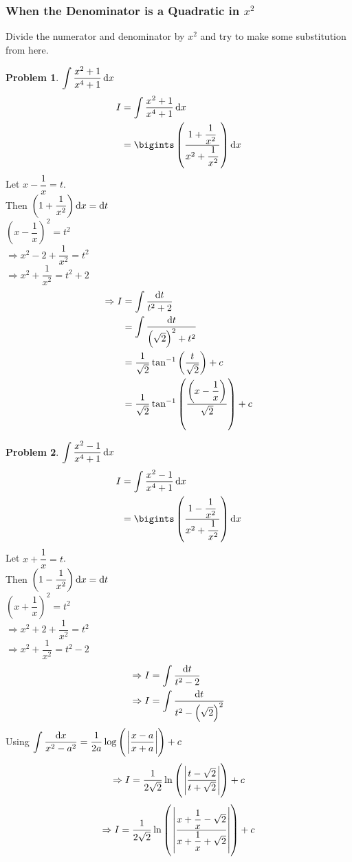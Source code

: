 \documentclass[14]{article}
\theoremstyle{definition}
\newtheorem{prob}{Problem}
\theoremstyle{case}
\begin{document}
\subsubsection{When the Denominator is a Quadratic in $x^2$}
Divide the numerator and denominator by $x^2$ and try to make some substitution from here.
\begin{prob}
$\displaystyle \int \dfrac{x^2 + 1}{x^4 + 1} \dif x$
\begin{align*}
I &= \int \dfrac{x^2 + 1}{x^4 + 1} \dif x\\
&= \bigints \left(\dfrac{1 + \dfrac1{x^2}}{x^2 + \dfrac1{x^2}}\right) \dif x
\end{align*}
Let $x - \dfrac1{x} = t$.\\
Then $\left(1 + \dfrac1{x^2}\right) \dif x = \dif t$\\
$\left( x - \dfrac1{x} \right)^2 = t^2$\\
$\Rightarrow x^2 - 2 + \dfrac1{x^2} = t^2$\\
$\Rightarrow x^2 + \dfrac1{x^2} = t^2 + 2$
\begin{align*}
\Rightarrow I &= \int \dfrac{\dif t}{t^2 + 2}\\
&= \int \dfrac{\dif t}{\left( \sqrt2 \right)^2 + t^2}\\
&= \dfrac1{\sqrt2} \tan^{-1} \left(\dfrac{t}{\sqrt 2} \right) + c\\
&= \dfrac1{\sqrt2} \tan^{-1} \left(\dfrac{\left(x - \dfrac1{x}\right)}{\sqrt 2} \right) + c
\end{align*}
\end{prob}
\pagebreak
\begin{prob}
$\displaystyle \int \dfrac{x^2 - 1}{x^4 + 1} \dif x$
\begin{align*}
I &= \int \dfrac{x^2 - 1}{x^4 + 1} \dif x\\
&= \bigints \left(\dfrac{1 - \dfrac1{x^2}}{x^2 + \dfrac1{x^2}}\right) \dif x
\end{align*}
Let $x + \dfrac1{x} = t$.\\
Then $\left(1 - \dfrac1{x^2}\right) \dif x = \dif t$\\
$\left( x + \dfrac1{x} \right)^2 = t^2$\\
$\Rightarrow x^2 + 2 + \dfrac1{x^2} = t^2$\\
$\Rightarrow x^2 + \dfrac1{x^2} = t^2 - 2$
\begin{align*}
\Rightarrow I &= \int \dfrac{\dif t}{t^2 - 2}\\
\Rightarrow I &= \int \dfrac{\dif t}{t^2 - \left( \sqrt2 \right)^2}
\end{align*}
Using $\displaystyle\int \dfrac{\dif x}{x^2 - a^2} = \dfrac1{2a} \log\left(\;\abs{\dfrac{x-a}{x+a}} \right) + c$
\[\Rightarrow I = \dfrac1{2\sqrt2} \ln\left(\;\abs{\dfrac{t-\sqrt2}{t+\sqrt2}} \right) + c\]
\[\Rightarrow I = \dfrac1{2\sqrt2} \ln\left(\;\abs{\dfrac{x + \dfrac1{x}-\sqrt2}{x + \dfrac1{x}+\sqrt2}} \right) + c\]
\end{prob}
\pagebreak
\end{document}
